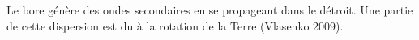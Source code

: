 







Le bore génère des ondes secondaires en se propageant dans le détroit. Une partie de cette dispersion est du à la rotation de la Terre (Vlasenko 2009).









